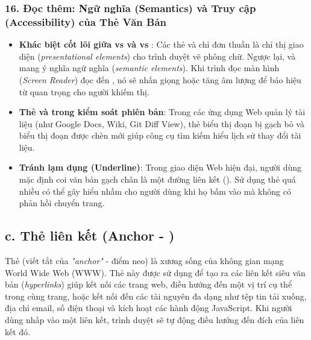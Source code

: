 \subsubsection{16. Đọc thêm: Ngữ nghĩa (Semantics) và Truy cập (Accessibility) của Thẻ Văn Bản}

\begin{conceptBox}
\begin{itemize}[leftmargin=1.5em, itemsep=3pt, parsep=0pt]
    \item \textbf{Khác biệt cốt lõi giữa  vs  và  vs }: Các thẻ  và  chỉ đơn thuần là chỉ thị giao diện (\textit{presentational elements}) cho trình duyệt vẽ phông chữ. Ngược lại,  và  mang ý nghĩa ngữ nghĩa (\textit{semantic elements}). Khi trình đọc màn hình (\textit{Screen Reader}) đọc đến , nó sẽ nhấn giọng hoặc tăng âm lượng để báo hiệu từ quan trọng cho người khiếm thị.
    \item \textbf{Thẻ  và  trong kiểm soát phiên bản}: Trong các ứng dụng Web quản lý tài liệu (như Google Docs, Wiki, Git Diff View), thẻ  biểu thị đoạn bị gạch bỏ và  biểu thị đoạn được chèn mới giúp công cụ tìm kiếm hiểu lịch sử thay đổi tài liệu.
    \item \textbf{Tránh lạm dụng  (Underline)}: Trong giao diện Web hiện đại, người dùng mặc định coi văn bản gạch chân là một đường liên kết (). Sử dụng thẻ  quá nhiều có thể gây hiểu nhầm cho người dùng khi họ bấm vào mà không có phản hồi chuyển trang.
\end{itemize}
\end{conceptBox}

\subsection{c. Thẻ liên kết (Anchor - )}

Thẻ  (viết tắt của \textit{"anchor"} - điểm neo) là xương sống của không gian mạng World Wide Web (WWW). Thẻ này được sử dụng để tạo ra các liên kết siêu văn bản (\textit{hyperlinks}) giúp kết nối các trang web, điều hướng đến một vị trí cụ thể trong cùng trang, hoặc kết nối đến các tài nguyên đa dạng như tệp tin tải xuống, địa chỉ email, số điện thoại và kích hoạt các hành động JavaScript. Khi người dùng nhấp vào một liên kết, trình duyệt sẽ tự động điều hướng đến đích của liên kết đó.


